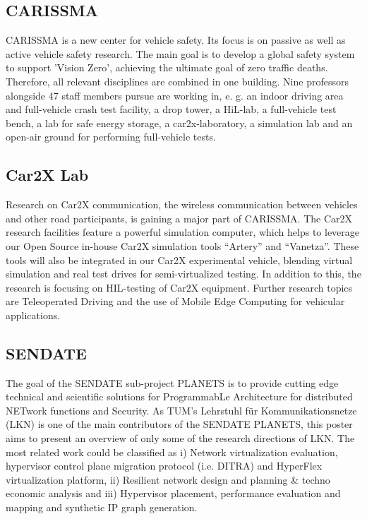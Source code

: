 \subsection{CARISSMA}

\ac{CARISSMA} is a new center for vehicle safety. Its focus is on passive as
well as active vehicle safety research. The main goal is to develop a global
safety system to support 'Vision Zero', achieving the ultimate goal of zero
traffic deaths. Therefore, all relevant disciplines are combined in one
building. Nine professors alongside 47 staff members pursue are working in, e.
g. an indoor driving area and full-vehicle crash test facility, a drop tower,
a HiL-lab, a full-vehicle test bench, a lab for safe energy storage, a
car2x-laboratory, a simulation lab and an open-air ground for performing
full-vehicle tests.

\subsection{Car2X Lab}

Research on Car2X communication, the wireless communication between vehicles
and other road participants, is gaining a major part of \ac{CARISSMA}. The
Car2X research facilities feature a powerful simulation computer, which helps
to leverage our Open Source in-house Car2X simulation tools “Artery” and
“Vanetza”. These tools will also be integrated in our Car2X experimental
vehicle, blending virtual simulation and real test drives for semi-virtualized
testing. In addition to this, the research is focusing on HIL-testing of Car2X
equipment. Further research topics are Teleoperated Driving and the use of
Mobile Edge Computing for vehicular applications.

\subsection{SENDATE}

The goal of the SENDATE sub-project PLANETS is to provide cutting edge technical
and scientific solutions for ProgrammabLe Architecture for distributed NETwork
functions and Security. As TUM's Lehrstuhl für Kommunikationsnetze (LKN) is
one of the main contributors of the SENDATE PLANETS, this poster aims to
present an overview of only some of the research directions of LKN. The most
related work could be classified as i) Network virtualization evaluation,
hypervisor control plane migration protocol (i.e. DITRA) and HyperFlex
virtualization platform, ii) Resilient network design and planning \& techno
economic analysis and iii) Hypervisor placement, performance evaluation and
mapping and synthetic IP graph generation.

